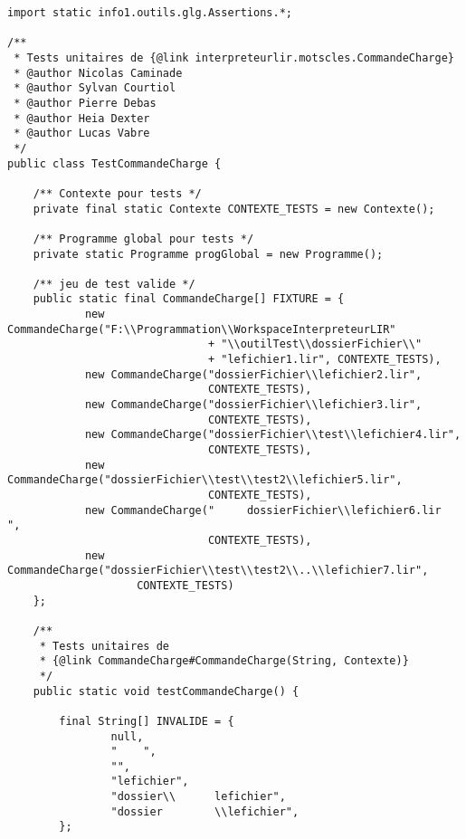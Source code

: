 \begin{enum}
\begin{verbatim}
import static info1.outils.glg.Assertions.*;

/** 
 * Tests unitaires de {@link interpreteurlir.motscles.CommandeCharge}
 * @author Nicolas Caminade
 * @author Sylvan Courtiol
 * @author Pierre Debas
 * @author Heia Dexter
 * @author Lucas Vabre
 */
public class TestCommandeCharge {

    /** Contexte pour tests */
    private final static Contexte CONTEXTE_TESTS = new Contexte();

    /** Programme global pour tests */
    private static Programme progGlobal = new Programme();

    /** jeu de test valide */
    public static final CommandeCharge[] FIXTURE = {
            new CommandeCharge("F:\\Programmation\\WorkspaceInterpreteurLIR"
                               + "\\outilTest\\dossierFichier\\"
                               + "lefichier1.lir", CONTEXTE_TESTS),
            new CommandeCharge("dossierFichier\\lefichier2.lir",
                               CONTEXTE_TESTS),
            new CommandeCharge("dossierFichier\\lefichier3.lir",
                               CONTEXTE_TESTS),
            new CommandeCharge("dossierFichier\\test\\lefichier4.lir",
                               CONTEXTE_TESTS),
            new CommandeCharge("dossierFichier\\test\\test2\\lefichier5.lir",
                               CONTEXTE_TESTS),
            new CommandeCharge("     dossierFichier\\lefichier6.lir     ",
                               CONTEXTE_TESTS),
            new CommandeCharge("dossierFichier\\test\\test2\\..\\lefichier7.lir",
                    CONTEXTE_TESTS)
    };

    /**
     * Tests unitaires de
     * {@link CommandeCharge#CommandeCharge(String, Contexte)}
     */
    public static void testCommandeCharge() {

        final String[] INVALIDE = {
                null,
                "    ",
                "",
                "lefichier",
                "dossier\\      lefichier",
                "dossier        \\lefichier",
        };


\end{verbatim}
\end{enum}
